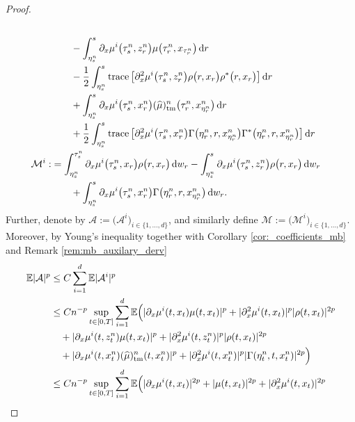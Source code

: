 \documentclass[reqno,  oneside, 12pt]{amsart}
\DeclareMathOperator{\tr}{trace}
\newcommand{\E}{\mathbb E}
\begin{document}
\begin{proof}
\begin{align}
		\\
		&\qquad -\int_{\eta^n_s}^{s}\partial_x \mu^{i}\big(\tau^n_s,z_{r}^n\big)\mu\big(\tau^n_r,x_{\tau^n_r}\big) \, \mathrm{d}r  \notag
		\\
		&\qquad - \frac{1}{2}\int_{\eta^n_s}^{s} \tr\big[\partial_{x}^2 \mu^{i}\big(\tau^n_s,z_{r}^n\big) 
		{\rho}\big(r,x_{r}\big){\rho}^*\big(r,x_{r}\big)\big]  \, \mathrm{d}r \notag
		\\
		&\qquad+\int_{\eta^n_s}^s\partial_x \mu^{i}\big(\tau^n_s,x_{r}^{n}\big)(\widehat \mu)_{\mathrm{tm}}^{n}\big(\tau^n_r,x_{\eta^n_r}^{n}\big) \, \mathrm{d}r  \notag
		\\
		&\qquad+ \frac{1}{2}\int_{\eta^n_s}^{s} \tr\big[\partial_{x}^2 \mu^{i}\big(\tau^n_s,x_r^{n}\big) 
		{\Gamma}\big(\eta^n_r,r,x_{\eta^n_r}^{n}\big){\Gamma}^*\big(\eta^n_r,r,x_{\eta^n_r}^{n}\big)\big]  \, \mathrm{d}r  \notag%
		\\
		\mathcal M^i:&= \int_{\eta^n_s}^{\tau^n_s} \partial_x \mu^{i}\big(\tau^n_s, x_{r}\big){\rho}\big(r,x_{r}\big) \, \mathrm{d}w_r-\int_{\eta^n_s}^{s} \partial_x \mu^{i}\big(\tau^n_s, z_{r}^n\big){\rho}\big(r,x_{r}\big) \, \mathrm{d}w_r
		\notag 
		\\
		&\qquad +\int_{\eta^n_s}^s \partial_x \mu^{i}\big(\tau^n_s, x_{r}^{n}\big){\Gamma}\big(\eta^n_r,r,x_{\eta^n_r}^{n}\big) \, \mathrm{d}w_r. \label{eq:M}
	\end{align}
	Further, denote by \( \mathcal{A}:= \big( \mathcal{A}^i \big)_{i \in \{1, \ldots, d\}} \), and   similarly define \( \mathcal{M} := \big( \mathcal{M}^i \big)_{i \in \{1, \ldots, d\}} \).
	Moreover, 	by  Young's inequality together with   Corollary \ref{cor:_coefficients_mb} and Remark \ref{rem:mb_auxilary_derv}
	\begin{align} \label{eq:estimate_A}
		\E|\mathcal A|^p&\leq C\sum_{i=1}^{d}\E|\mathcal A^i|^p \notag
		\\
		&\leq Cn^{-p}\sup_{t\in[0,T]} \sum_{i=1}^{d}\E\Big(|\partial_x \mu^{i}(t,x_{t})\mu(t,x_{t})|^{p}+|\partial_x^2 \mu^{i}(t,x_{t})|^p|\rho(t,x_{t})|^{2p} \notag
		\\
		&\quad+|\partial_x \mu^{i}(t,z_{t}^n)\mu(t,x_{t})|^{p}+|\partial_x^2 \mu^{i}(t,z_{t}^n)|^{p}|\rho(t,x_{t})|^{2p} \notag
		\\
		&\quad+|\partial_x \mu^{i}(t,x_{t}^n)(\widehat \mu)_{\mathrm{tm}}^{n}(t,x_{t}^{n})|^{p}+|\partial_x^2 \mu^{i}(t,x_{t}^n)|^p|{\Gamma}(\eta^n_t,t,x_{t}^{n})|^{2p}\Big) \notag
		\\
		&\leq  Cn^{-p}\sup_{t\in[0,T]} \sum_{i=1}^{d}\E\Big(|\partial_x \mu^{i}(t,x_{t})|^{2p}+|\mu(t,x_{t})|^{2p}+|\partial_x^2 \mu^{i}(t,x_{t})|^{2p} \notag

\end{align}
\end{proof}
\end{document}
